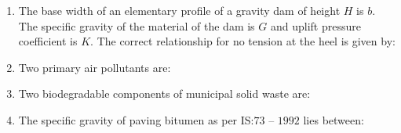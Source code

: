 \documentclass[journal]{IEEEtran}
\begin{document}
\begin{enumerate}
\item The base width of an elementary profile of a gravity dam of height $H$ is $b$. The specific gravity of the material of the dam is $G$ and uplift pressure coefficient is $K$. The correct relationship for no tension at the heel is given by: \hfill {}
\begin{enumerate}
\end{enumerate}

\item Two primary air pollutants are: \hfill {}
\begin{enumerate}
\end{enumerate}

\item Two biodegradable components of municipal solid waste are: \hfill {}
\begin{enumerate}
\end{enumerate}

\item The specific gravity of paving bitumen as per IS:$73$ -- $1992$ lies between: \hfill {}
\begin{enumerate}
\end{enumerate}


\end{enumerate}
\end{document}
